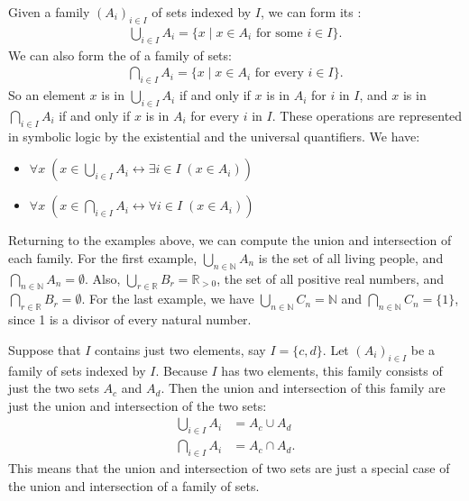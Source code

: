 \documentclass[letterpaper,10pt,english]{sphinxmanual}
\begin{document}
\sphinxAtStartPar
Given a family \((A_i)_{i\in I}\) of sets indexed by \(I\), we can form its :
\begin{equation*}
\begin{split}\bigcup_{i \in I} A_i = \{ x \mid x \in A_i \text{ for some $i \in I$} \}.\end{split}
\end{equation*}
\sphinxAtStartPar
We can also form the  of a family of sets:
\begin{equation*}
\begin{split}\bigcap_{i \in I} A_i = \{ x \mid x \in A_i \text{ for every $i \in I$} \}.\end{split}
\end{equation*}
\sphinxAtStartPar
So an element \(x\) is in \(\bigcup_{i \in I} A_i\) if and only if \(x\) is in \(A_i\) for  \(i\) in \(I\), and \(x\) is in \(\bigcap_{i \in I} A_i\) if and only if \(x\) is in \(A_i\) for every \(i\) in \(I\). These operations are represented in symbolic logic by the existential and the universal quantifiers. We have:
\begin{itemize}
\item {} 
\sphinxAtStartPar
\(\forall x \; (x \in \bigcup_{i \in I} A_i \leftrightarrow \exists i \in I \; (x \in A_i))\)

\item {} 
\sphinxAtStartPar
\(\forall x \; (x \in \bigcap_{i \in I} A_i \leftrightarrow \forall i \in I \; (x \in A_i))\)

\end{itemize}

\sphinxAtStartPar
Returning to the examples above, we can compute the union and intersection of each family. For the first example, \(\bigcup_{n \in \mathbb{N}} A_n\) is the set of all living people, and \(\bigcap_{n \in \mathbb{N}} A_n = \emptyset\). Also, \(\bigcup_{r \in \mathbb{R}} B_r = \mathbb{R}_{>0}\), the set of all positive real numbers, and \(\bigcap_{r \in \mathbb{R}} B_r = \emptyset\). For the last example, we have \(\bigcup_{n \in \mathbb{N}} C_n = \mathbb{N}\) and \(\bigcap_{n \in \mathbb{N}} C_n = \{1\}\), since 1 is a divisor of every natural number.

\sphinxAtStartPar
Suppose that \(I\) contains just two elements, say \(I=\{c, d\}\). Let \((A_i)_{i\in I}\) be a family of sets indexed by \(I\). Because \(I\) has two elements, this family consists of just the two sets \(A_c\) and \(A_d\). Then the union and intersection of this family are just the union and intersection of the two sets:
\begin{equation*}
\begin{split}\bigcup_{i \in I} A_i &= A_c \cup A_d\\
\bigcap_{i \in I} A_i &= A_c \cap A_d.\end{split}
\end{equation*}
\sphinxAtStartPar
This means that the union and intersection of two sets are just a special case of the union and intersection of a family of sets.
\end{document}
